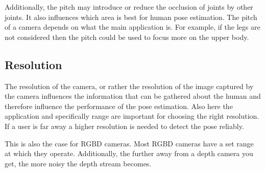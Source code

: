Additionally, the pitch may introduce or reduce the occlusion of joints by other joints. It also influences which area is best for human pose estimation. The pitch of a camera depends on what the main application is. For example, if the legs are not considered then the pitch could be used to focus more on the upper body.

\subsection{Resolution}

The resolution of the camera, or rather the resolution of the image captured by the camera influences the information that can be gathered about the human and therefore influence the performance of the pose estimation. Also here the application and specifically range are important for choosing the right resolution. If a user is far away a higher resolution is needed to detect the pose reliably.

This is also the case for RGBD cameras. Most RGBD cameras have a set range at which they operate. Additionally, the further away from a depth camera you get, the more noisy the depth stream becomes.
